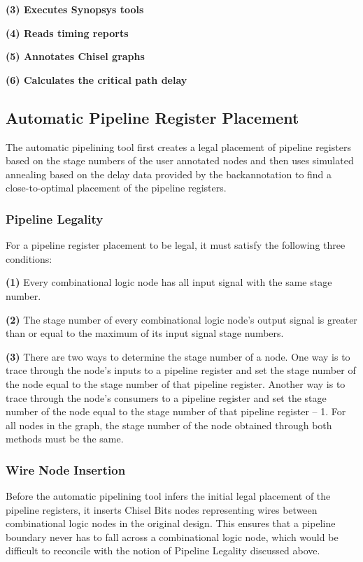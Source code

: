 {\bf (3) Executes Synopsys tools}

{\bf (4) Reads timing reports}

{\bf (5) Annotates Chisel graphs}

{\bf (6) Calculates the critical path delay}

\subsection{Automatic Pipeline Register Placement}
The automatic pipelining tool first creates a legal placement of pipeline registers based on the stage numbers of the user annotated nodes and then uses simulated annealing based on the delay data provided by the backannotation to find a close-to-optimal placement of the pipeline registers. 

\subsubsection{Pipeline Legality}
For a pipeline register placement to be legal, it must satisfy the following three conditions:

{\bf (1)} Every combinational logic node has all input signal with the same stage number.  

{\bf (2)} The stage number of every combinational logic node's output signal is greater than or equal to the maximum of its input signal stage numbers. 

{\bf (3)} There are two ways to determine the stage number of a node. One way is to trace through the node's inputs to a pipeline register and set the stage number of the node equal to the stage number of that pipeline register. Another way is to trace through the node’s consumers to a pipeline register and set the stage number of the node equal to the stage number of that pipeline register – 1. For all nodes in the graph, the stage number of the node obtained through both methods must be the same.

\subsubsection{Wire Node Insertion}
\label{wiresection}
Before the automatic pipelining tool infers the initial legal placement of the pipeline registers, it inserts Chisel Bits nodes representing wires between combinational logic nodes in the original design. This ensures that a pipeline boundary never has to fall across a combinational logic node, which would be difficult to reconcile with the notion of Pipeline Legality discussed above.
